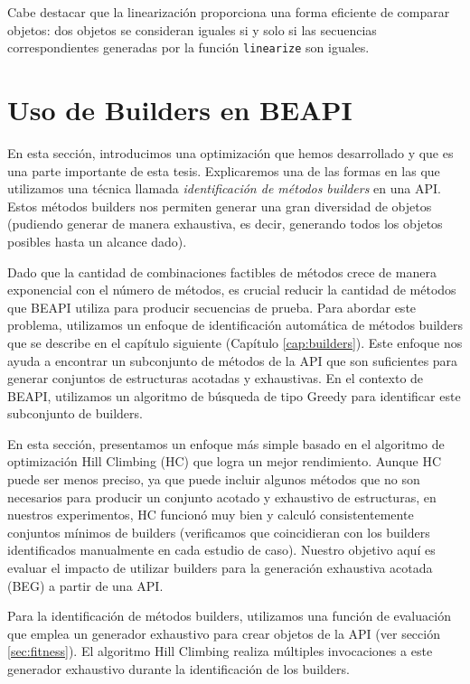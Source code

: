 Cabe destacar que la linearización proporciona una forma eficiente de comparar objetos: dos objetos se consideran iguales si y solo si las secuencias correspondientes generadas por la función \texttt{linearize} son iguales.


\section{Uso de Builders en BEAPI}
\label{sec:builders}
En esta sección, introducimos una optimización que hemos desarrollado y que es una parte importante de esta tesis. Explicaremos una de las formas en las que utilizamos una técnica llamada \emph{identificación de métodos builders} en una API. Estos métodos builders nos permiten generar una gran diversidad de objetos (pudiendo generar de manera exhaustiva, es decir, generando todos los objetos posibles hasta un alcance dado).

Dado que la cantidad de combinaciones factibles de métodos crece de manera exponencial con el número de métodos, es crucial reducir la cantidad de métodos que \textsf{BEAPI} utiliza para producir secuencias de prueba. Para abordar este problema, utilizamos un enfoque de identificación automática de métodos builders que se describe en el capítulo siguiente (Capítulo \ref{cap:builders}). Este enfoque nos ayuda a encontrar un subconjunto de métodos de la API que son suficientes para generar conjuntos de estructuras acotadas y exhaustivas. En el contexto de \textsf{BEAPI}, utilizamos un algoritmo de búsqueda de tipo Greedy para identificar este subconjunto de builders.

En esta sección, presentamos un enfoque más simple basado en el algoritmo de optimización Hill Climbing (HC) que logra un mejor rendimiento. Aunque HC puede ser menos preciso, ya que puede incluir algunos métodos que no son necesarios para producir un conjunto acotado y exhaustivo de estructuras, en nuestros experimentos, HC funcionó muy bien y calculó consistentemente conjuntos mínimos de builders (verificamos que coincidieran con los builders identificados manualmente en cada estudio de caso). Nuestro objetivo aquí es evaluar el impacto de utilizar builders para la generación exhaustiva acotada (BEG) a partir de una API.

Para la identificación de métodos builders, utilizamos una función de evaluación que emplea un generador exhaustivo para crear objetos de la API (ver sección \ref{sec:fitness}). El algoritmo Hill Climbing realiza múltiples invocaciones a este generador exhaustivo durante la identificación de los builders.

